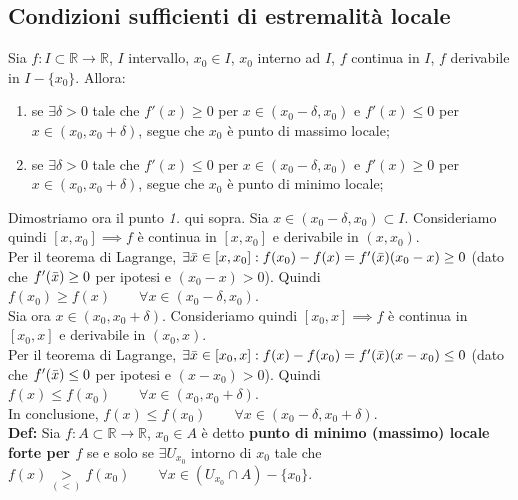 \documentclass{article}
\begin{document}
\subsection{Condizioni sufficienti di estremalità locale}
Sia $f: I \subset \mathbb{R} \xrightarrow{} \mathbb{R}$, $I$ intervallo, $x_0 \in I$, $x_0$ interno ad $I$, $f$ continua in $I$, $f$ derivabile in $I - \{x_0\}$. Allora:
\begin{enumerate}
    \item se $\exists \delta > 0$ tale che $f'(x) \geq 0$ per $x \in (x_0 - \delta, x_0)$ e $f'(x) \leq 0$ per $x \in (x_0, x_0 + \delta)$, segue che $x_0$ è punto di massimo locale;
    \item se $\exists \delta > 0$ tale che $f'(x) \leq 0$ per $x \in (x_0 - \delta, x_0)$ e $f'(x) \geq 0$ per $x \in (x_0, x_0 + \delta)$, segue che $x_0$ è punto di minimo locale;
\end{enumerate}

\noindent Dimostriamo ora il punto \textit{1.} qui sopra. Sia $x \in (x_0 - \delta, x_0) \subset I$. Consideriamo quindi $[x, x_0] \implies f$ è continua in $[x, x_0]$ e derivabile in $(x, x_0)$.\\
Per il teorema di Lagrange, $\exists \Bar{x} \in [x, x_0] : f(x_0) - f(x) = f'(\Bar{x})(x_0 - x) \geq 0$ (dato che $f'(\Bar{x}) \geq 0$ per ipotesi e $(x_0 - x) > 0$). Quindi $f(x_0) \geq f(x) \qquad \forall x \in (x_0 - \delta, x_0)$.\\
Sia ora $x \in (x_0, x_0 + \delta)$. Consideriamo quindi $[x_0, x] \implies f$ è continua in $[x_0, x]$ e derivabile in $(x_0, x)$. \\
Per il teorema di Lagrange, $\exists \Bar{x} \in [x_0, x] : f(x) - f(x_0) = f'(\Bar{x})(x - x_0) \leq 0$ (dato che $f'(\Bar{x}) \leq 0$ per ipotesi e $(x - x_0) > 0$). Quindi $f(x) \leq f(x_0) \qquad \forall x \in (x_0, x_0 + \delta)$.\\
In conclusione, $f(x) \leq f(x_0) \qquad \forall x \in (x_0 - \delta, x_0 + \delta)$.\\

\noindent\textbf{Def:} Sia $f: A \subset \mathbb{R} \xrightarrow{} \mathbb{R}$, $x_0 \in A$ è detto \textbf{punto di minimo (massimo) locale forte per $f$} se e solo se $\exists U_{x_0}$ intorno di $x_0$ tale che $f(x) \underset{(<)}{>} f(x_0) \qquad \forall x \in (U_{x_0} \cap A) - \{x_0\}$.
\end{document}
